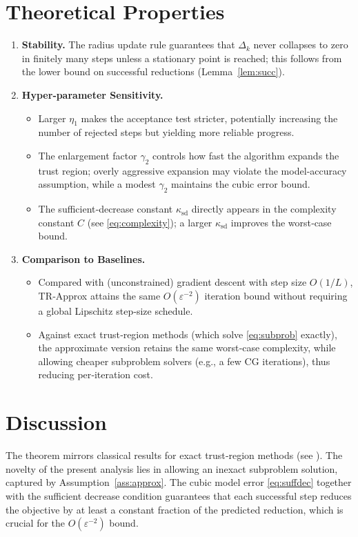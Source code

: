 \documentclass{article}
\begin{document}
\section*{Theoretical Properties}
\begin{enumerate}
\item \textbf{Stability.} The radius update rule guarantees that $\Delta_{k}$ never collapses to zero in finitely many steps unless a stationary point is reached; this follows from the lower bound on successful reductions (Lemma~\ref{lem:succ}).

\item \textbf{Hyper‑parameter Sensitivity.}
\begin{itemize}
\item Larger $\eta_{1}$ makes the acceptance test stricter, potentially increasing the number of rejected steps but yielding more reliable progress.
\item The enlargement factor $\gamma_{2}$ controls how fast the algorithm expands the trust region; overly aggressive expansion may violate the model‑accuracy assumption, while a modest $\gamma_{2}$ maintains the cubic error bound.
\item The sufficient‑decrease constant $\kappa_{\mathrm{sd}}$ directly appears in the complexity constant $C$ (see \eqref{eq:complexity}); a larger $\kappa_{\mathrm{sd}}$ improves the worst‑case bound.
\end{itemize}

\item \textbf{Comparison to Baselines.}
\begin{itemize}
\item Compared with (unconstrained) gradient descent with step size $O(1/L)$, TR‑Approx attains the same $O(\varepsilon^{-2})$ iteration bound without requiring a global Lipschitz step‑size schedule.
\item Against exact trust‑region methods (which solve \eqref{eq:subprob} exactly), the approximate version retains the same worst‑case complexity, while allowing cheaper subproblem solvers (e.g., a few CG iterations), thus reducing per‑iteration cost.
\end{itemize}
\end{enumerate}

\section*{Discussion}
The theorem mirrors classical results for exact trust‑region methods (see \cite{Conn1999}). The novelty of the present analysis lies in allowing an inexact subproblem solution, captured by Assumption~\ref{ass:approx}. The cubic model error \eqref{eq:suffdec} together with the sufficient decrease condition guarantees that each successful step reduces the objective by at least a constant fraction of the predicted reduction, which is crucial for the $O(\varepsilon^{-2})$ bound.
\end{document}
